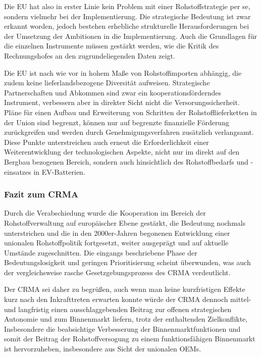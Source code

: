\documentclass[12pt,a4paper,oneside]{book} %
\begin{document}
Die EU hat also in erster Linie kein Problem mit einer Rohstoffstrategie per se, sondern vielmehr bei der Implementierung. Die strategische Bedeutung ist zwar erkannt worden, jedoch bestehen erhebliche strukturelle Herausforderungen bei der Umsetzung der Ambitionen in die Implementierung. Auch die Grundlagen für die einzelnen Instrumente müssen gestärkt werden, wie die Kritik des Rechnungshofes an den zugrundeliegenden Daten zeigt.

Die EU ist nach wie vor in hohem Maße von Rohstoffimporten abhängig, die zudem keine lieferlandsbezogene Diversität aufweisen. Strategische Partnerschaften und Abkommen sind zwar ein kooperationsförderndes Instrument, verbessern aber in direkter Sicht nicht die Versorungssicherheit. Pläne für einen Aufbau und Erweiterung von Schritten der Rohstofflieferketten in der Union sind begrenzt, können nur auf begrenzte finanzielle Förderung zurückgreifen und werden durch Genehmigungsverfahren zusätzlich verlangsamt. Diese Punkte unterstreichen auch erneut die Erforderlichkeit einer Weiterentwicklung der technologischen Aspekte, nicht nur im direkt auf den Bergbau bezogenen Bereich, sondern auch hinsichtlich des Rohstoffbedarfs und -einsatzes in EV-Batterien.


\subsubsection{Fazit zum CRMA}
Durch die Verabschiedung wurde die Kooperation im Bereich der Rohstoffverwaltung auf europäischer Ebene gestärkt, die Bedeutung nochmals unterstrichen und die in den 2000er-Jahren begonenen Entwicklung einer unionalen Rohstoffpolitik fortgesetzt, weiter ausgeprägt und auf aktuelle Umstände zugeschnitten. Die eingangs beschriebene Phase der Bedeutungslosigkeit und geringen Prioritisierung scheint überwunden, was auch der vergleichsweise rasche Gesetzgebungsprozess des CRMA verdeutlicht.

Der CRMA sei daher zu begrüßen, auch wenn man keine kurzfristigen Effekte kurz nach den Inkrafttreten erwarten konnte würde der CRMA dennoch mittel- und langfristig einen ausschlaggebenden Beitrag zur offenen strategischen Autonomie und zum Binnenmarkt liefern, trotz der enthaltenden Zielkonflikte,\autocite{Schäffer/Hach, ZRP 2023, 210f.} Insbesondere die beabsichtige Verbesserung der Binnenmarktfunktionen und somit der Beitrag der Rohstoffversogung zu einem funktionsfähigen Binnenmarkt ist hervorzuheben,\autocite{Frenz 2025, S: 1064} insbesondere aus Sicht der unionalen OEMs.
\end{document}
